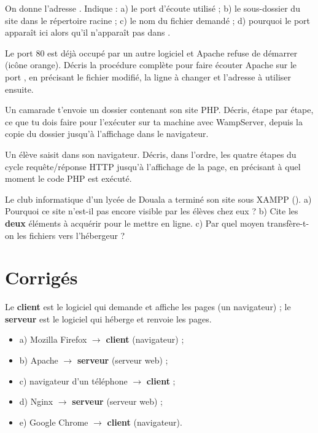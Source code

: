 On donne l'adresse . Indique :
a) le port d'écoute utilisé ; b) le sous-dossier du site dans le répertoire racine ;
c) le nom du fichier demandé ; d) pourquoi le port  apparaît ici alors qu'il
n'apparaît pas dans .


Le port 80 est déjà occupé par un autre logiciel et Apache refuse de démarrer (icône
orange). Décris la procédure complète pour faire écouter Apache sur le port ,
en précisant le fichier modifié, la ligne à changer et l'adresse à utiliser ensuite.

Un camarade t'envoie un dossier  contenant son site PHP. Décris, étape
par étape, ce que tu dois faire pour l'exécuter sur ta machine avec WampServer, depuis
la copie du dossier jusqu'à l'affichage dans le navigateur.

Un élève saisit  dans son navigateur. Décris,
dans l'ordre, les quatre étapes du cycle requête/réponse HTTP jusqu'à l'affichage de la
page, en précisant à quel moment le code PHP est exécuté.

Le club informatique d'un lycée de Douala a terminé son site sous XAMPP
(). a) Pourquoi ce site n'est-il pas encore visible par
les élèves chez eux ? b) Cite les \textbf{deux} éléments à acquérir pour le mettre en
ligne. c) Par quel moyen transfère-t-on les fichiers vers l'hébergeur ?

\section{Corrigés}

Le \textbf{client} est le logiciel qui demande et affiche les pages (un navigateur) ;
le \textbf{serveur} est le logiciel qui héberge et renvoie les pages.
\begin{itemize}
  \item a) Mozilla Firefox $\rightarrow$ \textbf{client} (navigateur) ;
  \item b) Apache $\rightarrow$ \textbf{serveur} (serveur web) ;
  \item c) navigateur d'un téléphone $\rightarrow$ \textbf{client} ;
  \item d) Nginx $\rightarrow$ \textbf{serveur} (serveur web) ;
  \item e) Google Chrome $\rightarrow$ \textbf{client} (navigateur).
\end{itemize}

